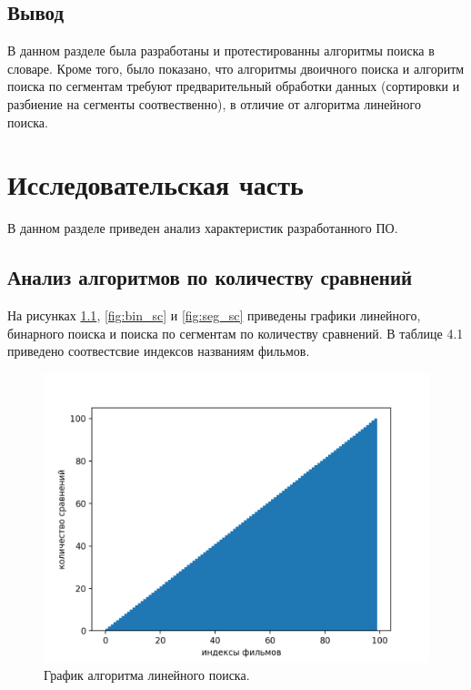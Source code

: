 \documentclass[12pt]{report}
\begin{document}
\section*{Вывод}
	
В данном разделе была разработаны и протестированны алгоритмы поиска в словаре. Кроме того, было показано, что алгоритмы двоичного поиска и алгоритм поиска по сегментам требуют предварительный обработки данных (сортировки и разбиение на сегменты соотвественно), в отличие от алгоритма линейного поиска.
	
\chapter{Исследовательская часть}
	
В данном разделе приведен анализ характеристик разработанного ПО.
	
\section{Анализ алгоритмов по количеству сравнений}

На рисунках \ref{fig:lin_sc}, \ref{fig:bin_sc} и \ref{fig:seg_sc} приведены графики линейного, бинарного поиска и поиска по сегментам по количеству сравнений. В таблице 4.1 приведено соотвестсвие индексов названиям фильмов.
	
	\begin{figure}[H]
		\centering
		\includegraphics[scale=0.9]{lin.png}
		\caption{График алгоритма линейного поиска.}
		\label{fig:lin_sc}
	\end{figure}
	
\end{document}
